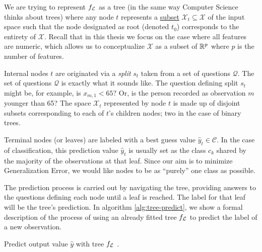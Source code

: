 We are trying to represent $f_{\mathcal{L}}$ as a tree (in the same way Computer Science
thinks about trees) where any node $t$ represents a \underline{subset}
$\mathcal{X}_t \subseteq \mathcal{X}$ of the input space such that the node
designated as root (denoted $t_0$) corresponds to the entirety of $\mathcal{X}$.
Recall that in this thesis we focus on the case where all features are numeric,
which allows us to conceptualize $\mathcal{X}$ as a subset of $\mathbb{R}^{p}$ where $p$
is the number of features.

Internal nodes $t$ are originated via a \textit{split} $s_t$ taken from a set of
questions $\mathcal{Q}$.  The set of questions $\mathcal{Q}$ is exactly what it
sounds like. The question defining split $s_t$ might be, for example, is $x_{m,
1} < 65$? Or, is the person recorded as observation $m$ younger than 65? The
space $\mathcal{X}_t$ represented by node $t$ is made up of disjoint subsets
corresponding to each of $t$'s children nodes; two in the case of binary trees. 

Terminal nodes (or leaves) are labeled with a best guess value $\widehat{y}_t
\in \mathcal{C}$. In the case of classification, this prediction value
$\widehat{y}_t$ is usually set as the class $c_k$ shared by the majority of the
observations at that leaf. Since our aim is to minimize Generalization Error, we
would like nodes to be as ``purely'' one class as possible.

The prediction process is carried out by navigating the tree,
providing answers to the questions defining each node until a leaf is reached.
The label for that leaf will be the tree's prediction. In algorithm
\ref{alg:tree-predict}, we show a formal description of the process of using an
already fitted tree $f_{\mathcal{L}}$ to predict the label of a new observation. 

\begin{algorithm}
    \caption[Tree prediction algorithm]{Predict output value $\widehat{y}$ with
        tree $f_{\mathcal{L}}$ \cite[Ch.~3.2]{louppe2014}.}
    \label{alg:tree-predict}
\end{algorithm}

